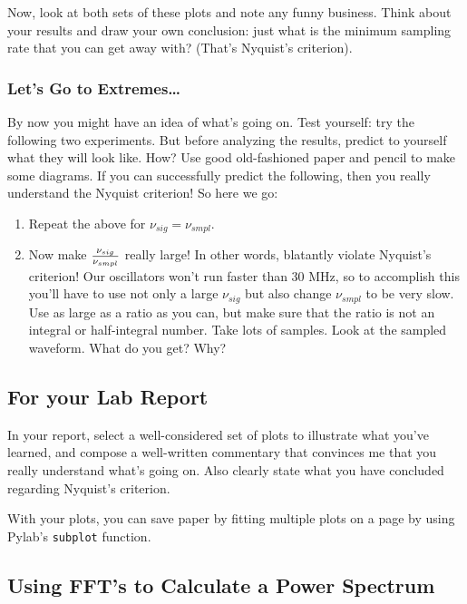 \documentclass[11pt]{article}
\begin{document}
Now, look at both sets of these plots and note any funny business.
Think about your results and draw your own conclusion: just what is the
minimum sampling rate that you can get away with? (That's Nyquist's
  criterion). 

\subsubsection{Let's Go to Extremes\dots}

By now you might have an idea of what's going on. Test yourself:
try the following two experiments. But before analyzing the
results, predict to yourself what they will look like. How? Use
good old-fashioned paper and pencil to make some diagrams. If you can
successfully predict the following, then you really understand
the Nyquist criterion! So here we go:

\begin{enumerate}
\item Repeat the above for $\nu_{sig} = \nu_{smpl}$. 
\item Now make $\nu_{sig} \over \nu_{smpl}$ really large!
        In other words, blatantly violate Nyquist's criterion!
        Our oscillators won't run faster than 30 MHz, so to
        accomplish this you'll have to use not only a large
        $\nu_{sig}$ but also change $\nu_{smpl}$ to be very
        slow. Use as large as a ratio as you can, but make sure that
        the ratio is not an integral or half-integral number. Take lots of
        samples. Look at the sampled waveform.  What do you get?
        Why?
\end{enumerate}

\subsection{For your Lab Report}

\noindent In your report, select a well-considered set of plots to
illustrate what you've learned, and compose a well-written commentary
that convinces me that you really understand what's going on. Also
clearly state what you have concluded regarding Nyquist's criterion. 

    With your plots, you can save paper by fitting multiple plots on a page
by using Pylab's \verb$subplot$ function.

\subsection{Using FFT's to Calculate a Power Spectrum} 
\label{pwrspectrum}
 
\end{document}
